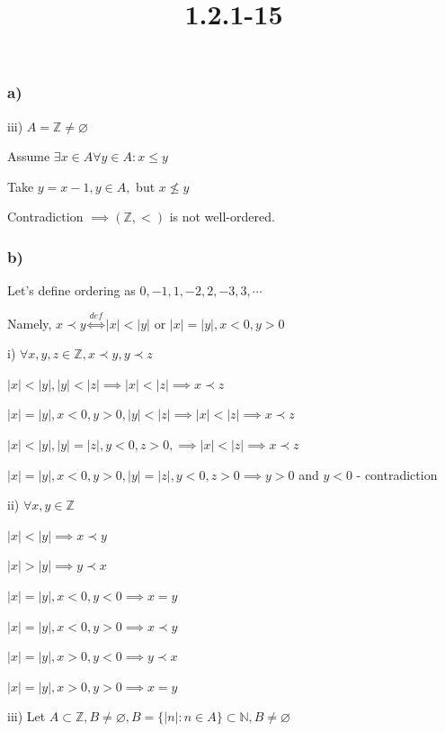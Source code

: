 \documentclass{article}
\title{1.2.1-15}
\begin{document}
\maketitle

\subsubsection*{a)}

iii) $A = \mathbb{Z} \neq \varnothing$

Assume $\exists x \in A \forall y \in A: x \leq y$

Take $y = x - 1, y \in A,$ but $x \not\leq y$

Contradiction $\implies (\mathbb{Z}, <)$ is not well-ordered.

\subsubsection*{b)}

Let's define ordering as $0, -1, 1, -2, 2, -3, 3, \cdots$

Namely, $x \prec y \overset{def}{\iff} |x| < |y|$ or $|x|=|y|, x < 0, y > 0$

i) $\forall x, y, z \in \mathbb{Z}, x \prec y, y \prec z$

\item $|x|<|y|, |y|<|z| \implies |x|<|z| \implies x \prec z$
\item $|x|=|y|, x < 0, y > 0, |y| < |z| \implies |x| < |z| \implies x \prec z$
\item $|x|<|y|, |y| = |z|, y < 0, z > 0, \implies |x| < |z| \implies x \prec z$
\item $|x|=|y|, x < 0,  y > 0, |y| = |z|, y < 0, z > 0 \implies y > 0$ and $y < 0$ - contradiction

ii) $\forall x, y \in \mathbb{Z}$

\item $|x|<|y| \implies x \prec y$
\item $|x|>|y| \implies y \prec x$
\item $|x|=|y|, x < 0, y < 0 \implies x = y$
\item $|x|=|y|, x < 0, y > 0 \implies x \prec y$
\item $|x|=|y|, x > 0, y < 0 \implies y \prec x$
\item $|x|=|y|, x > 0, y > 0 \implies x = y$

iii) Let $A \subset \mathbb{Z}, B \neq \varnothing, B = \{ |n|: n \in A \} \subset \mathbb{N}, B \neq \varnothing$
\end{document}

